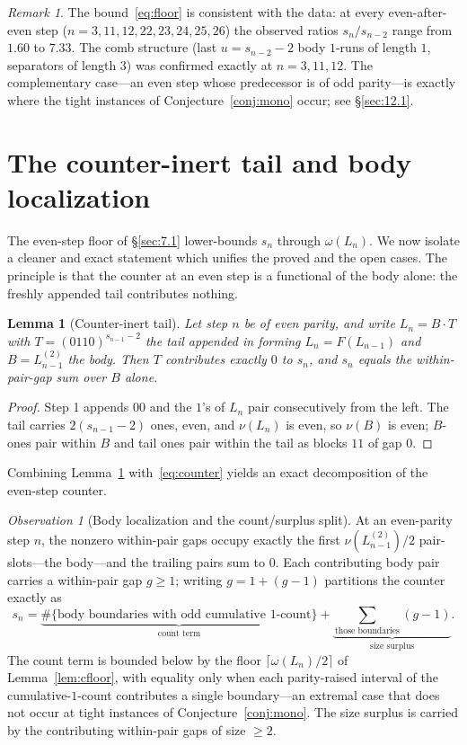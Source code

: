 \documentclass[11pt,reqno]{amsart}
\theoremstyle{plain}
\newtheorem{lemma}{Lemma}
\theoremstyle{definition}
\theoremstyle{remark}
\newtheorem{remark}{Remark}
\newtheorem{observation}{Observation}
\begin{document}
\begin{remark}\label{rem:floor-consistent}
The bound~\eqref{eq:floor} is consistent with the data: at every even-after-even step ($n=3,11,12,22,23,24,25,26$) the observed ratios $s_n/s_{n-2}$ range from $1.60$ to $7.33$. The comb structure (last $u=s_{n-2}-2$ body $1$-runs of length $1$, separators of length $3$) was confirmed exactly at $n=3,11,12$. The complementary case---an even step whose predecessor is of odd parity---is exactly where the tight instances of Conjecture~\ref{conj:mono} occur; see \S\ref{sec:12.1}.
\end{remark}

\section{The counter-inert tail and body localization}\label{sec:inert}
The even-step floor of \S\ref{sec:7.1} lower-bounds $s_n$ through $\omega(L_n)$. We now isolate a cleaner and exact statement which unifies the proved and the open cases. The principle is that the counter at an even step is a functional of the body alone: the freshly appended tail contributes nothing.

\begin{lemma}[Counter-inert tail]\label{lem:inert}
Let step $n$ be of even parity, and write $L_n=B\cdot T$ with $T=(0110)^{s_{n-1}-2}$ the tail appended in forming $L_n=F(L_{n-1})$ and $B=L^{(2)}_{n-1}$ the body. Then $T$ contributes exactly $0$ to $s_n$, and $s_n$ equals the within-pair-gap sum over $B$ alone.
\end{lemma}
\begin{proof}
Step 1 appends $00$ and the $1$'s of $L_n$ pair consecutively from the left. The tail carries $2(s_{n-1}-2)$ ones, even, and $\nu(L_n)$ is even, so $\nu(B)$ is even; $B$-ones pair within $B$ and tail ones pair within the tail as blocks $11$ of gap $0$.
\end{proof}

Combining Lemma~\ref{lem:inert} with~\eqref{eq:counter} yields an exact decomposition of the even-step counter.

\begin{observation}[Body localization and the count/surplus split]\label{obs:decomp}
At an even-parity step $n$, the nonzero within-pair gaps occupy exactly the first $\nu(L^{(2)}_{n-1})/2$ pair-slots---the body---and the trailing pairs sum to $0$. Each contributing body pair carries a within-pair gap $g\ge 1$; writing $g=1+(g-1)$ partitions the counter exactly as
\begin{equation}\label{eq:decomp}
s_n = \underbrace{\#\{\text{body boundaries with odd cumulative $1$-count}\}}_{\text{count term}} + \underbrace{\sum_{\text{those boundaries}}(g-1)}_{\text{size surplus}}.
\end{equation}
The count term is bounded below by the floor $\lceil\omega(L_n)/2\rceil$ of Lemma~\ref{lem:cfloor}, with equality only when each parity-raised interval of the cumulative-$1$-count contributes a single boundary---an extremal case that does not occur at tight instances of Conjecture~\ref{conj:mono}. The size surplus is carried by the contributing within-pair gaps of size $\ge 2$.
\end{observation}
\end{document}
